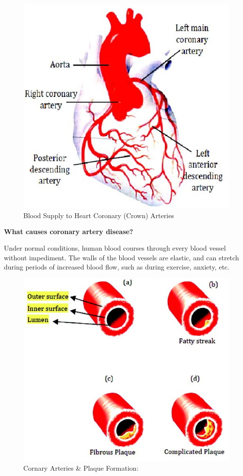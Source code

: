 \begin{figure}
\includegraphics{images/040.jpg}
\caption{Blood Supply to Heart Coronary (Crown) Arteries}
\end{figure}

\textbf{What causes coronary artery disease?}

Under normal conditions, human blood courses through every blood vessel without impediment. The walls of the blood vessels are elastic, and can stretch during periods of increased blood flow, such as during exercise, anxiety, etc.

\begin{figure}
\includegraphics{images/041.jpg}
\caption{Cornary Arteries \& Plaque Formation:}
\end{figure}

